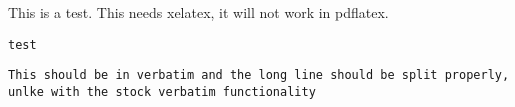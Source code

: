 \documentclass{article}
\begin{document}
This is a test. This needs xelatex, it will not work in pdflatex.

\verb!test!

\verb!This should be in verbatim and the long line should be split properly, unlke with the stock verbatim functionality!
\end{document}
